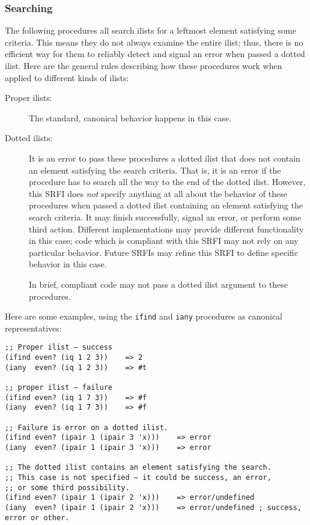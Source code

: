 \subsubsection{{Searching}}

The following procedures all search ilists for a leftmost element
satisfying some criteria. This means they do not always examine the
entire ilist; thus, there is no efficient way for them to reliably
detect and signal an error when passed a dotted ilist. Here are the
general rules describing how these procedures work when applied to
different kinds of ilists:

\begin{description}
\item[ Proper ilists: ]
The standard, canonical behavior happens in this case.
\item[ Dotted ilists: ]
It is an error to pass these procedures a dotted ilist that does not
contain an element satisfying the search criteria. That is, it is an
error if the procedure has to search all the way to the end of the
dotted ilist. However, this SRFI does \emph{not} specify anything at all
about the behavior of these procedures when passed a dotted ilist
containing an element satisfying the search criteria. It may finish
successfully, signal an error, or perform some third action. Different
implementations may provide different functionality in this case; code
which is compliant with this SRFI may not rely on any particular
behavior. Future SRFIs may refine this SRFI to define specific behavior
in this case.

In brief, compliant code may not pass a dotted ilist argument to these
procedures.
\end{description}

Here are some examples, using the \texttt{ifind} and \texttt{iany}
procedures as canonical representatives:

\begin{verbatim}
;; Proper ilist — success
(ifind even? (iq 1 2 3))    => 2
(iany  even? (iq 1 2 3))    => #t

;; proper ilist — failure
(ifind even? (iq 1 7 3))    => #f
(iany  even? (iq 1 7 3))    => #f

;; Failure is error on a dotted ilist.
(ifind even? (ipair 1 (ipair 3 'x)))    => error
(iany  even? (ipair 1 (ipair 3 'x)))    => error

;; The dotted ilist contains an element satisfying the search.
;; This case is not specified — it could be success, an error, 
;; or some third possibility.
(ifind even? (ipair 1 (ipair 2 'x)))    => error/undefined
(iany  even? (ipair 1 (ipair 2 'x)))    => error/undefined ; success, error or other.
\end{verbatim}

